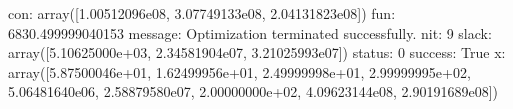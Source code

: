 \documentclass[letterpaper,10pt,english]{sphinxmanual}
\begin{document}
\begin{sphinxVerbatim}[commandchars=\\\{\}]
     con: array([1.00512096e\PYGZhy{}08, 3.07749133e\PYGZhy{}08, 2.04131823e\PYGZhy{}08])
     fun: \PYGZhy{}6830.499999040153
 message: \PYGZsq{}Optimization terminated successfully.\PYGZsq{}
     nit: 9
   slack: array([5.10625000e+03, 2.34581904e\PYGZhy{}07, 3.21025993e\PYGZhy{}07])
  status: 0
 success: True
       x: array([5.87500046e+01, 1.62499956e+01, 2.49999998e+01, 2.99999995e+02,
       5.06481640e\PYGZhy{}06, 2.58879580e\PYGZhy{}07, 2.00000000e+02, 4.09623144e\PYGZhy{}08,
       2.90191689e\PYGZhy{}08])
\end{sphinxVerbatim}







\renewcommand{\indexname}{Index}
\printindex
\end{document}
